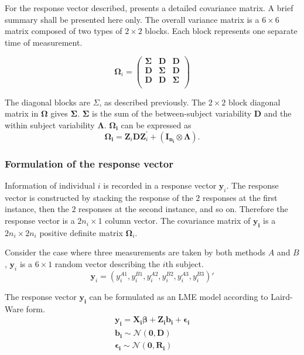 \documentclass[12pt, a4paper]{report}
\theoremstyle{plain}
\theoremstyle{definition}
\theoremstyle{remark}
\begin{document}
	For the response vector described, \citet{hamlett} presents a detailed covariance matrix. A brief summary shall be presented here only. The overall variance matrix is a $6 \times 6$ matrix composed of two types of $2 \times 2$ blocks. Each block represents one separate time of measurement.
	
	\[
	\boldsymbol{\Omega}_{i} = \left(
	\begin{array}{ccc}
	\boldsymbol{\Sigma} & \boldsymbol{D} & \boldsymbol{D}\\
	\boldsymbol{D} & \boldsymbol{\Sigma} & \boldsymbol{D}\\
	\boldsymbol{D} & \boldsymbol{D} & \boldsymbol{\Sigma}\\
	\end{array}\right)
	\]
	
	The diagonal blocks are $\Sigma$, as described previously. The $2 \times 2$ block diagonal matrix in $\boldsymbol{\Omega}$ gives $\boldsymbol{\Sigma}$. $\boldsymbol{\Sigma}$ is the sum of the between-subject variability $\boldsymbol{D}$ and the within subject variability $\boldsymbol{\Lambda}$. $\boldsymbol{\Omega_{i}}$ can be expressed as
	\[
	\boldsymbol{\Omega_{i}} = \boldsymbol{Z}_{i}\boldsymbol{D}\boldsymbol{Z}_{i}^\prime + ({\boldsymbol{I_{n_{i}}} \otimes \boldsymbol{\Lambda}}).
	\]
	
	
	\subsubsection{Formulation of the response vector}
	Information of individual $i$ is recorded in a response vector $\boldsymbol{y}_{i}$. The response vector is constructed by stacking the response of the $2$ responses at the first instance, then the $2$ responses at the second instance, and so on. Therefore the response vector is a $2n_{i} \times 1$ column vector.
	The covariance matrix of $\boldsymbol{y_{i}}$ is a $2n_{i} \times 2n_{i}$ positive definite matrix $\boldsymbol{\Omega}_{i}$.
	
	Consider the case where three measurements are taken by both methods $A$ and $B$, $\boldsymbol{y}_{i}$ is a $6 \times 1$ random vector describing the $i$th subject.
	\[
	\boldsymbol{y}_{i} = (y_{i}^{A1},y_{i}^{B1},y_{i}^{A2},y_{i}^{B2},y_{i}^{A3},y_{i}^{B3}) \prime
	\]
	
	The response vector $\boldsymbol{y_{i}}$ can be formulated as an LME model according to Laird-Ware form.
	\begin{eqnarray*}
		\boldsymbol{y_{i}} = \boldsymbol{X_{i}\beta}  + \boldsymbol{Z_{i}b_{i}} + \boldsymbol{\epsilon_{i}}\\
		\boldsymbol{b_{i}} \sim \mathcal{N}(\boldsymbol{0,D})\\
		\boldsymbol{\epsilon_{i}} \sim \mathcal{N}(\boldsymbol{0,R_{i}})
	\end{eqnarray*}
	
\end{document}
